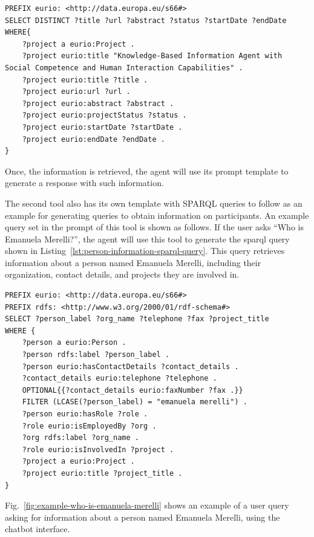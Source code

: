 \begin{lstlisting}[language=SPARQL, caption={\gls{sparql} query for getting information of a project entitled ``Knowledge-Based Information Agent with Social Competence and Human Interaction''}, label={lst:project-information-sparql-query}]
PREFIX eurio: <http://data.europa.eu/s66#>
SELECT DISTINCT ?title ?url ?abstract ?status ?startDate ?endDate
WHERE{
    ?project a eurio:Project .
    ?project eurio:title "Knowledge-Based Information Agent with Social Competence and Human Interaction Capabilities" .
    ?project eurio:title ?title .
    ?project eurio:url ?url .
    ?project eurio:abstract ?abstract .
    ?project eurio:projectStatus ?status .
    ?project eurio:startDate ?startDate .
    ?project eurio:endDate ?endDate .
}
\end{lstlisting}

Once, the information is retrieved, the agent will use its prompt template to generate a response with such information.

The second tool also has its own template with SPARQL queries to follow as an example for generating queries to obtain information on participants.
An example query set in the prompt of this tool is shown as follows.
If the user asks ``Who is Emanuela Merelli?'', the agent will use this tool to generate the \gls{sparql} query shown in Listing~\ref{lst:person-information-sparql-query}.
This query retrieves information about a person named Emanuela Merelli, including their organization, contact details, and projects they are involved in.

\begin{lstlisting}[language=SPARQL, caption={\gls{sparql} query for getting information of a person}, label={lst:person-information-sparql-query}]
PREFIX eurio: <http://data.europa.eu/s66#>
PREFIX rdfs: <http://www.w3.org/2000/01/rdf-schema#>
SELECT ?person_label ?org_name ?telephone ?fax ?project_title
WHERE {
    ?person a eurio:Person .
    ?person rdfs:label ?person_label .
    ?person eurio:hasContactDetails ?contact_details .
    ?contact_details eurio:telephone ?telephone .
    OPTIONAL{{?contact_details eurio:faxNumber ?fax .}}
    FILTER (LCASE(?person_label) = "emanuela merelli") .
    ?person eurio:hasRole ?role .
    ?role eurio:isEmployedBy ?org .
    ?org rdfs:label ?org_name .
    ?role eurio:isInvolvedIn ?project .
    ?project a eurio:Project .
    ?project eurio:title ?project_title .
}
\end{lstlisting}

Fig.~\ref{fig:example-who-is-emanuela-merelli} shows an example of a user query asking for information about a person named Emanuela Merelli, using the chatbot interface.


